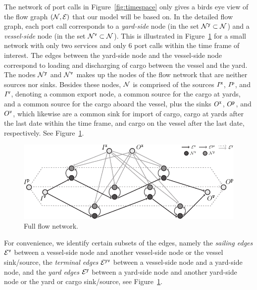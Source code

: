 The network of port calls in Figure~\ref{fig:timespace} only gives a birds eye view of the flow graph $(\mathcal{N},\mathcal{E})$ that our model will be based on. In the detailed flow graph, each port call corresponds to a \emph{yard-side} node (in the set $\mathcal{N}^\texttt{y}\subset \mathcal{N}$) and a \emph{vessel-side} node (in the set $\mathcal{N}^\texttt{v}\subset\mathcal{N}$). This is illustrated in Figure~\ref{fig:flow} for a small network with only two services and only 6 port calls within the time frame of interest. The edges between the yard-side node and the vessel-side node correspond to loading and discharging of cargo between the vessel and the yard. The nodes $\mathcal{N}^\texttt{y}$ and $\mathcal{N}^\texttt{v}$ makes up the nodes of the flow network that are neither sources nor sinks. %
Besides these nodes, $\mathcal{N}$ is comprised of the sources $I^\texttt{x}$, $I^\texttt{p}$, and $I^\texttt{v}$, denoting a common export node, a common source for the cargo at yards, and a common source for the cargo aboard the vessel, plus the sinks $O^\texttt{x}$, $O^\texttt{p}$, and $O^\texttt{v}$, which likewise are a common sink for import of cargo, cargo at yards after the last date within the time frame, and cargo on the vessel after the last date, respectively. See Figure~\ref{fig:flow}.

\begin{figure}[pos=htbp]
	\centering
		\includegraphics[scale = 1]{figures/fullFlow.pdf}
		\caption{Full flow network.}  \label{fig:flow}
\end{figure}

For convenience, we identify certain subsets of the edges, namely the \emph{sailing edges} $\mathcal{E}^\texttt{v}$ between a vessel-side node and another vessel-side node or the vessel sink/source, 
the \emph{terminal edges} $\mathcal{E}^\texttt{yv}$ between a vessel-side node and a yard-side node, 
and the \emph{yard edges} $\mathcal{E}^{\texttt{y}}$ between a yard-side node and another yard-side node or the yard or cargo sink/source, 
see Figure~\ref{fig:flow}.

